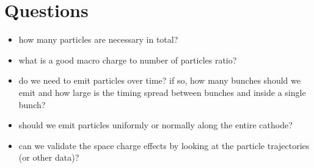 \section{Questions}
\begin{itemize}
  \item how many particles are necessary in total?
  \item what is a good macro charge to number of particles ratio?
  \item do we need to emit particles over time? if so, how many bunches should we emit and how large is the timing spread between bunches and inside a single bunch?
  \item should we emit particles uniformly or normally along the entire cathode?
  \item can we validate the space charge effects by looking at the particle trajectories (or other data)?
\end{itemize}
